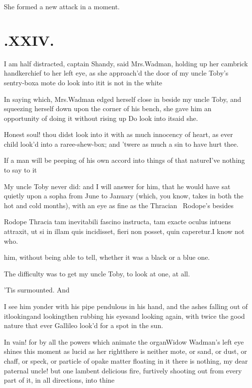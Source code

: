 \documentclass[twoside]{article}
\begin{document}
\tsh She formed a new attack in a moment.

\vfill{}\eject\null
\section{.\enspace XXIV.}

\quad\tsh I am half distracted, captain Shandy, said
Mrs.\@ Wadman, holding up her cambrick handkerchief to her
left eye, as she approach’d the door of my uncle
Toby’s sentry-box\tsh a mote \tsh\break
{}
do look into it\tsk it is not in the white\tsk 

In saying which, Mrs.\@ Wadman edged herself close in
beside my uncle Toby, and squeezing herself down upon the
corner of his bench, she gave him an opportunity of doing it without rising up 
\tsh Do look into it\tsk said she.

Honest soul! thou didst look into it with as much innocency of
heart, as ever child look’d into a raree-shew-box; and
’twere as much a sin to have hurt thee.

\tsh If a man will be peeping of his own accord into
things of that nature\break\tsh I’ve nothing to say to
it\tsh

My uncle Toby never did: and I will answer for him, that he
would have sat quietly upon a sopha from June to January (which,
you know, takes in both the hot and cold months), with an eye as
fine as the Thracian \fnast\  Rodope’s besides\break

\bgroup\small
\indent\fnast\enspace 
Rodope Thracia tam inevitabili fascino\break
instructa, tam exacte oculus intuens attraxit,\break
ut si in illam quis incidisset, fieri non posset,\break
quin caperetur.\tsh I know not who.\par\egroup
{}\eject 
\noindent
him, without being able to tell,
whether it was a black or a blue one.

The difficulty was to get my uncle Toby, to look at one,
at all.

’Tis surmounted. And

I see him yonder with his pipe pendulous in his hand, and the
ashes falling out of it\tsk looking\tsk and
looking\tsk\break then
rubbing his eyes\tsh and looking again, with twice the
good nature that ever Gallileo look’d for a spot in the
sun.

\tsh In vain! for by all the powers\break
which animate the organ\tsk Widow\break
Wadman’s left eye shines this
moment as lucid as her right\tsk there is neither mote, or
sand, or dust, or chaff, or speck, or particle of opake matter
floating in it \tsk there is nothing, my dear paternal uncle! but
one lambent delicious fire, furtively shooting out from every part
of it, in all directions, into thine\tsh
\end{document}
